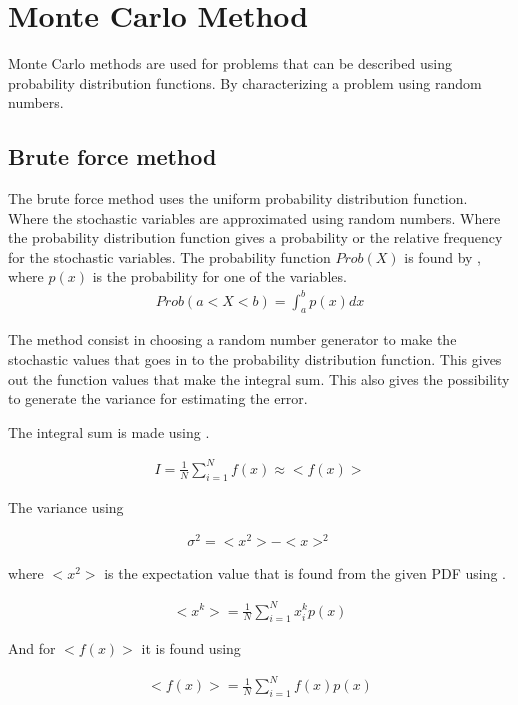 \section{Monte Carlo Method}


Monte Carlo methods are used for problems that can be described using probability distribution functions. By characterizing a problem using random numbers. 

\subsection{Brute force method}
The brute force method uses the uniform probability distribution function. Where the stochastic variables are approximated using random numbers. Where the probability distribution function gives a probability or the relative frequency for the stochastic variables. The probability function $Prob(X)$ is found by , where $p(x)$ is the probability for one of the variables.
\begin{align}
Prob(a < X <b) = \int_a^b p(x) dx
\label{eq:probfunc}
\end{align}

The method consist in choosing a random number generator to make the stochastic values that goes in to the probability distribution function. This gives out the function values that make the integral sum. This also gives the possibility to generate the variance for estimating the error. 

The integral sum is made using . 

\begin{align}
I = \frac{1}{N}\sum_{i=1}^{N} f(x) \approx <f(x)>
\label{eq:integralBF}
\end{align}
 
The variance using 

\begin{align}
\sigma^2 = <x^2> - <x>^2
\label{eq:varianceBF} 
\end{align}

where $<x^2>$ is the expectation value that is found from the given PDF using . 

\begin{align}
<x^k> = \frac{1}{N}\sum_{i=1}^N x_i^k p(x)
\label{eq:expvalue}
\end{align} 

And for $<f(x)>$ it is found using 

\begin{align}
<f(x)> = \frac{1}{N} \sum_{i=1}^{N} f(x)p(x) 
\label{eq:expf}
\end{align}

